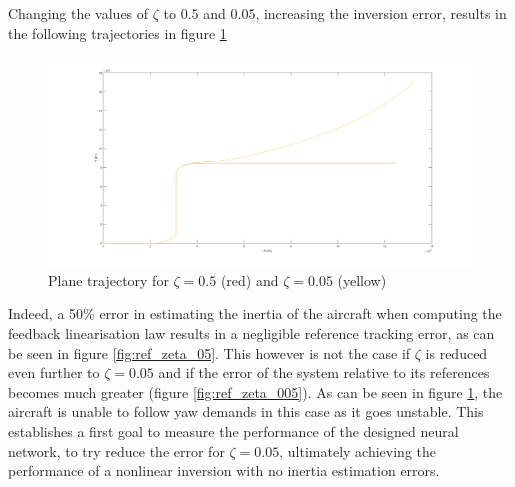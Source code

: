 Changing the values of $\zeta$ to $0.5$ and $0.05$, increasing the inversion error, results in the following trajectories in figure \ref{fig:inversion_error}

\begin{figure}[H]
\centering
\includegraphics[width=\textwidth]{Figures/Results/inversion_error.png}
\caption[Plane trajectory with inertia estimation errors]{Plane trajectory for $\zeta = 0.5$ (red) and $\zeta= 0.05$ (yellow)}
\label{fig:inversion_error}
\end{figure}

Indeed, a 50\% error in estimating the inertia of the aircraft when computing the feedback linearisation law results in a negligible reference tracking error, as can be seen in figure \ref{fig:ref_zeta_05}. This however is not the case if $\zeta$ is reduced even further to $\zeta = 0.05$ and if the error of the system relative to its references becomes much greater (figure \ref{fig:ref_zeta_005}). As can be seen in figure \ref{fig:inversion_error}, the aircraft is unable to follow yaw demands in this case as it goes unstable. This establishes a first goal to measure the performance of the designed neural network, to try reduce the error for $\zeta = 0.05$, ultimately achieving the performance of a nonlinear inversion with no inertia estimation errors.

